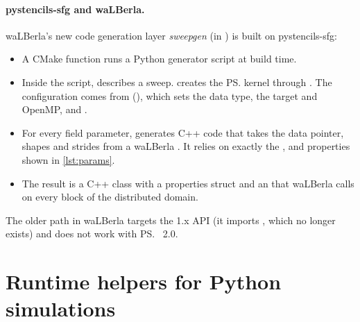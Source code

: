 \paragraph{pystencils-sfg and waLBerla.}
waLBerla's new code generation layer \emph{sweepgen} (in
) is built on pystencils-sfg:
\begin{itemize}
  \item A CMake function  runs
        a Python generator script at build time.
  \item Inside the script,  describes a sweep.
         creates the \ps{} kernel through
        . The
        configuration comes from 
        (), which sets the data type, the target and
        OpenMP, and .
  \item For every field parameter,  generates
        C++ code that takes the data pointer, shapes and strides from a waLBerla
        . It relies on exactly the ,
         and  properties shown in \cref{lst:params}.
  \item The result is a C++ class with a properties struct and an  that
        waLBerla calls on every block of the distributed domain.
\end{itemize}
The older  path in waLBerla targets the 1.x API (it
imports , which no longer exists) and
does not work with \ps{}~2.0.

\section{Runtime helpers for Python simulations}

